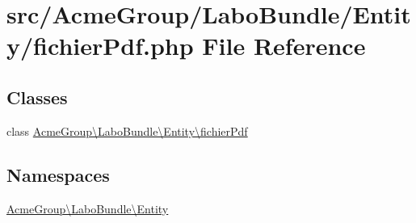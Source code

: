 \hypertarget{fichier_pdf_8php}{\section{src/\+Acme\+Group/\+Labo\+Bundle/\+Entity/fichier\+Pdf.php File Reference}
\label{fichier_pdf_8php}
}
\subsection*{Classes}
\begin{DoxyCompactItemize}
\item 
class \hyperlink{class_acme_group_1_1_labo_bundle_1_1_entity_1_1fichier_pdf}{Acme\+Group\textbackslash{}\+Labo\+Bundle\textbackslash{}\+Entity\textbackslash{}fichier\+Pdf}
\end{DoxyCompactItemize}
\subsection*{Namespaces}
\begin{DoxyCompactItemize}
\item 
 \hyperlink{namespace_acme_group_1_1_labo_bundle_1_1_entity}{Acme\+Group\textbackslash{}\+Labo\+Bundle\textbackslash{}\+Entity}
\end{DoxyCompactItemize}
